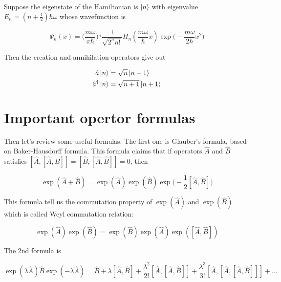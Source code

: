 \documentclass{article}
\begin{document}
        Suppose the eigenstate of the Hamiltonian is $\ket{n}$ with eigenvalue $E_n=(n+\frac{1}{2})\hbar\omega$ whose wavefunction is 
        
        \begin{equation}
            \Psi_n(x)=\bigl(\frac{m\omega}{\pi\hbar}\bigr)^{\frac{1}{4}}\frac{1}{\sqrt{2^n n!}}H_n(\frac{m\omega}{\hbar}x)\exp\bigl(-\frac{m\omega}{2\hbar}x^2\bigr)
        \end{equation}
        
        Then the creation and annihilation operators give out

        \begin{equation}
            \begin{split}
                \hat{a}\ket{n}&=\sqrt{n}\ket{n-1} \\
                \hat{a}^\dagger\ket{n}&=\sqrt{n+1}\ket{n+1}
            \end{split}
        \end{equation}

        \section{Important opertor formulas}

        Then let's review some useful formulas. The first one is Glauber's formula, based on Baker-Hausdorff formula. This formula claims that if operators $\hat{A}$ and $\hat{B}$ satisfies $[\hat{A}, [\hat{A}, \hat{B}]] = [\hat{B}, [\hat{A}, \hat{B}]] = 0$, then 

        \begin{equation}\label{formula1}
            \exp(\hat{A}+\hat{B}) = \exp(\hat{A})\exp(\hat{B})\exp\biggl(-\frac{1}{2}[\hat{A}, \hat{B}]\biggr)
        \end{equation}

        This formula tell us the commutation property of $\exp(\hat{A})$ and $\exp(\hat{B})$ which is called Weyl commutation relation:
        
        \begin{equation}
            \exp(\hat{A})\exp(\hat{B}) = \exp(\hat{B})\exp(\hat{A})\exp([\hat{A}, \hat{B}])
        \end{equation}

        \vbox{}

        \vbox{}

        The 2nd formula is 

        \begin{equation}\label{formula2}
            \exp(\lambda\hat{A})\hat{B}\exp(-\lambda\hat{A}) = \hat{B} + \lambda [\hat{A},\hat{B}] + \frac{\lambda^2}{2!} [\hat{A}, [\hat{A}, \hat{B}]] + \frac{\lambda^3}{3!}[\hat{A}, [\hat{A}, [\hat{A}, \hat{B}]]] + \dots
        \end{equation}
\end{document}
